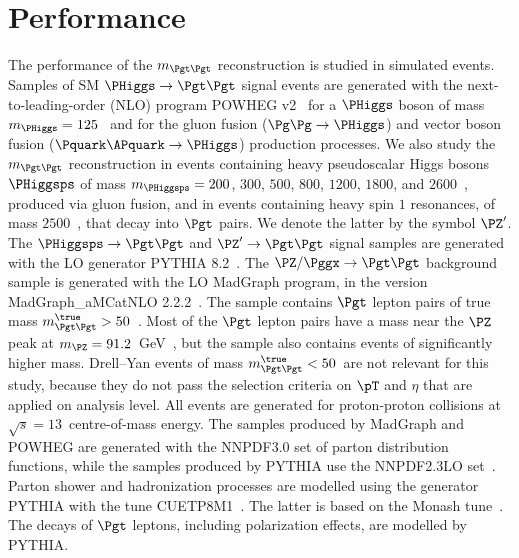\section{Performance}
\label{sec:performance}

The performance of the $m_{\Pgt\Pgt}$ reconstruction is studied in simulated events.
Samples of SM $\PHiggs \to \Pgt\Pgt$ signal events
are generated with the next-to-leading-order (NLO) program POWHEG v2~\cite{POWHEG1,POWHEG2,POWHEG3}
for a $\PHiggs$ boson of mass $m_{\PHiggs} = 125$~\GeV 
and for the gluon fusion ($\Pg\Pg \to \PHiggs$) and vector boson fusion ($\Pquark\APquark \to \PHiggs$) production processes.
We also study the $m_{\Pgt\Pgt}$ reconstruction in events containing
heavy pseudoscalar Higgs bosons $\PHiggsps$ of mass $m_{\PHiggsps} = 200$, $300$, $500$, $800$, $1200$, $1800$, and $2600$~\GeV,
produced via gluon fusion, and in events containing heavy spin $1$
resonances, of mass $2500$~\GeV, that decay into $\Pgt$ pairs.
We denote the latter by the symbol $\PZ'$. 
The $\PHiggsps \to \Pgt\Pgt$ and $\PZ' \to \Pgt\Pgt$ signal samples are generated with the LO generator PYTHIA 8.2~\cite{pythia8}.
The $\PZ/\Pggx \to \Pgt\Pgt$ background sample is generated with the LO MadGraph program, in the version MadGraph\_aMCatNLO 2.2.2~\cite{MadGraph_aMCatNLO}.
The sample contains $\Pgt$ lepton pairs of true mass $m_{\Pgt\Pgt}^{\true} > 50$~\GeV.
Most of the $\Pgt$ lepton pairs have a mass near the $\PZ$ peak at $m_{\PZ} = 91.2$~GeV~\cite{PDG}, 
but the sample also contains events of significantly higher mass.
Drell--Yan events of mass $m_{\Pgt\Pgt}^{\true} < 50$~\GeV are not relevant for this study, 
because they do not pass the selection criteria on $\pT$ and $\eta$ that are applied on analysis level.
All events are generated for proton-proton collisions at $\sqrt{s} = 13$~\TeV centre-of-mass energy.
The samples produced by MadGraph and POWHEG are generated with the NNPDF3.0 set of parton distribution functions,
while the samples produced by PYTHIA use the NNPDF2.3LO set~\cite{NNPDF1,NNPDF2,NNPDF3}.
Parton shower and hadronization processes are modelled using the generator PYTHIA with the tune CUETP8M1~\cite{PYTHIA_CUETP8M1tune_CMS}.
The latter is based on the Monash tune~\cite{PYTHIA_MonashTune}.
The decays of $\Pgt$ leptons, including polarization effects, are modelled by PYTHIA.

